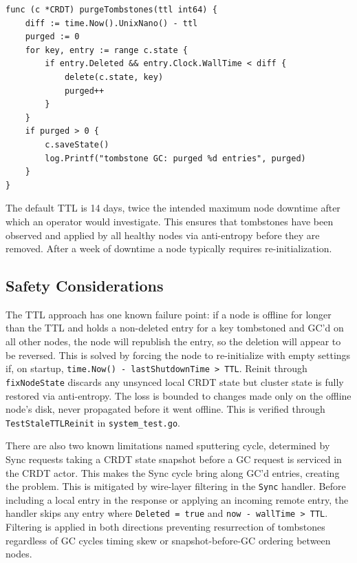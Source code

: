 \documentclass[conference]{IEEEtran}
\begin{document}
\begin{lstlisting}
func (c *CRDT) purgeTombstones(ttl int64) {
    diff := time.Now().UnixNano() - ttl
    purged := 0
    for key, entry := range c.state {
        if entry.Deleted && entry.Clock.WallTime < diff {
            delete(c.state, key)
            purged++
        }
    }
    if purged > 0 {
        c.saveState()
        log.Printf("tombstone GC: purged %d entries", purged)
    }
}
\end{lstlisting}

The default TTL is 14 days, twice the intended maximum node downtime
after which an operator would investigate. This ensures that tombstones have been
observed and applied by all healthy nodes via anti-entropy before they are removed.
After a week of downtime a node typically requires re-initialization.

\subsection{Safety Considerations}

The TTL approach has one known failure point: if a node is offline for longer
than the TTL and holds a non-deleted entry for a key tombstoned and GC'd on all other nodes,
the node will republish the entry, so the deletion will appear to be reversed.
This is solved by forcing the node to re-initialize with empty settings if,
on startup, \texttt{time.Now() - lastShutdownTime > TTL}.
Reinit through \texttt{fixNodeState} discards any unsynced local CRDT state but cluster state is fully restored via anti-entropy.
The loss is bounded to changes made only on the offline node's disk, never propagated before it went offline.
This is verified through \texttt{TestStaleTTLReinit} in \texttt{system\_test.go}.

There are also two known limitations named sputtering cycle, determined by
Sync requests taking a CRDT state snapshot before a GC request is serviced in the CRDT actor.
This makes the Sync cycle bring along GC'd entries, creating the problem.
This is mitigated by wire-layer filtering in the \texttt{Sync} handler.
Before including a local entry in the response or applying an incoming remote entry,
the handler skips any entry where \texttt{Deleted = true} and
\texttt{now - wallTime > TTL}. Filtering is applied in both directions preventing resurrection
of tombstones regardless of GC cycles timing skew or snapshot-before-GC ordering
between nodes.

\end{document}
